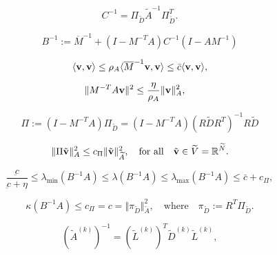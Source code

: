 \documentclass[11pt]{article}
\begin{document}
\begin{equation}\label{eq:two-grid_1}
C^{-1}=\Pi_{\widetilde{D}} \widetilde{A}^{-1} \Pi^T_{\widetilde{D}}. 
\end{equation}

\begin{equation}\label{eq:two-grid_3}
B^{-1} := \overline{M}^{-1} 
+ (I - M^{-T} A) C^{-1} (I - A M^{-1})  
\end{equation}

\begin{equation}\label{eq:eb_1}
\underbar{}\langle{{\bf{{v}}}},{{\bf{{v}}}}\rangle \le \rho_A \langle \overline{M}^{-1}{{\bf{{v}}}},{{\bf{{v}}}}\rangle
\le \bar{c}\langle{{\bf{{v}}}},{{\bf{{v}}}}\rangle, 
\end{equation}

\begin{equation}\label{eq:eb_2}
 \Vert M^{-T} A {{\bf{{v}}}}\Vert^2\le \frac{\eta}{\rho_A}\Vert {{\bf{{v}}}} \Vert_A^2, \quad 
\end{equation}

\begin{equation}\label{eq:two-grid_4}
\Pi:=(I-M^{-T} A)\Pi_{\widetilde{D}}=
(I-M^{-T} A)(R\widetilde{D}R^T)^{-1}R\widetilde{D}
\end{equation}

\begin{equation}\label{eq:eb_3}
\Vert \Pi \tilde{{{\bf{{v}}}}}\Vert_A^2\le c_{\Pi} 
\Vert \tilde{{{\bf{{v}}}}}\Vert_{\widetilde{A}}^2, \quad 
\mbox{for all}\quad \tilde{{{\bf{{v}}}}}\in \widetilde{V}={{\mathbb{R}}^{{\widetilde{N}}}}. 
\end{equation}

\begin{equation} \label{eq:eb_7}
  \frac{\underbar{c}}{\underbar{c}+\eta} \le    \lambda_{\min}(B^{-1}A)  
\le \lambda(B^{-1}A) \le     \lambda_{\max}(B^{-1}A)\le\bar{c}+c_{\Pi},
\end{equation}

\begin{equation}\label{eq:pi}
\kappa(B^{-1}A)\le c_{\Pi}=c=\Vert\pi_{\widetilde{D}}
\Vert^2_{\widetilde{A}},
\quad\mbox{where}\quad
\pi_{\widetilde{D}} := R^T \Pi_{\widetilde{D}} .
\end{equation}

\begin{equation}\label{factorizationK}
({\widetilde{A}}^{(k)})^{-1} = 
(\widetilde{L}^{(k)})^T \widetilde{D}^{(k)} \widetilde{L}^{(k)} ,
\end{equation}
\end{document}
